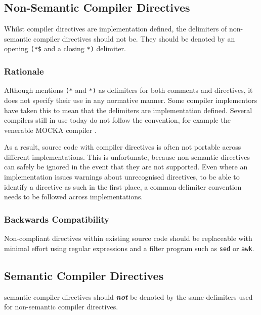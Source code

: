 \documentclass[10pt,a4paper]{article}
\renewcommand{\emph}[1]{\textbf{\textit{#1}}}
\begin{document}
\subsection{Non-Semantic Compiler Directives}

Whilst \glspl{compiler directive} are implementation defined, the delimiters of
\glspl{non-semantic compiler directive} should not be. They should be denoted
by an opening \verb|(*$| and a closing \verb|*)| delimiter.

\subsubsection{Rationale}

Although \cite[p.18]{Wirth88} mentions \verb|(*| and \verb|*)| as delimiters
for both comments and directives, it does not specify their use in any
normative manner. Some compiler implementors have taken this to mean that
the delimiters are implementation defined. Several compilers still in use
today do not follow the convention, for example the venerable MOCKA compiler
\cite{MOCKA}.

As a result, source code with \glspl{compiler directive} is often not portable
across different implementations. This is unfortunate, because non-semantic
directives can safely be ignored in the event that they are not supported.
Even where an implementation issues warnings about unrecognised directives,
to be able to identify a directive as such in the first place, a common
delimiter convention needs to be followed across implementations.

\subsubsection{Backwards Compatibility}

Non-compliant directives within existing source code should be replaceable with
minimal effort using regular expressions and a filter program such as
\verb|sed| or \verb|awk|. 


\subsection{Semantic Compiler Directives}

\Glspl{semantic compiler directive} should \emph{not} be denoted by the same
delimiters used for \glspl{non-semantic compiler directive}.
\end{document}
